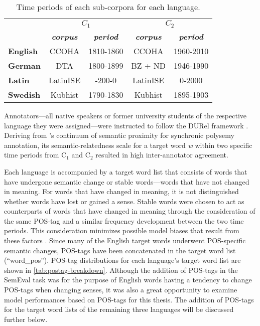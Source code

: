 \begin{table}[h]
\small
\centering
\begin{tabular}{l|cc|cc|}
\cline{2-5}
\textbf{}      & \multicolumn{2}{c|}{\textbf{$C_1$}}                    & \multicolumn{2}{c|}{\textbf{$C_2$}}                    \\
                                       & \textit{\textbf{corpus}} & \textit{\textbf{period}} & \textit{\textbf{corpus}} & \textit{\textbf{period}} \\ \hline
\multicolumn{1}{|l|}{\textbf{English}} & CCOHA                    & 1810-1860                & CCOHA                    & 1960-2010                \\ \hline
\multicolumn{1}{|l|}{\textbf{German}}  & DTA                      & 1800-1899                & BZ + ND                  & 1946-1990                \\ \hline
\multicolumn{1}{|l|}{\textbf{Latin}}   & LatinISE                 & -200-0                   & LatinISE                 & 0-2000                   \\ \hline
\multicolumn{1}{|l|}{\textbf{Swedish}} & Kubhist                  & 1790-1830                & Kubhist                  & 1895-1903                \\ \hline
\end{tabular}
\caption{Time periods of each sub-corpora for each language.}
\label{tab:subcorpora-time}
\end{table}

Annotators—all native speakers or former university students of the respective language they were assigned—were instructed to follow the DURel framework \citep{DURel2018}. Deriving from \citet{blank1997prinzipien}’s continuum of semantic proximity for synchronic polysemy annotation, its semantic-relatedness scale for a target word \emph{w} within two specific time periods from C$_1$ and C$_2$ resulted in high inter-annotator agreement. 
	
Each language is accompanied by a target word list that consists of words that have undergone semantic change or stable words—words that have not changed in meaning. For words that have changed in meaning, it is not distinguished whether words have lost or gained a sense. Stable words were chosen to act as counterparts of words that have changed in meaning through the consideration of the same POS-tag and a similar frequency development between the two time periods. This consideration minimizes possible model biases that result from these factors \citep{dubossarsky-etal-2017-outta}. Since many of the English target words underwent POS-specific semantic changes, POS-tags have been concatenated in the target word list (“word\_pos”). POS-tag distributions for each language's target word list are shown in \autoref{tab:postag-breakdown}. Although the addition of POS-tags in the SemEval task was for the purpose of English words having a tendency to change POS-tags when changing senses, it was also a great opportunity to examine model performances based on POS-tags for this thesis. The addition of POS-tags for the target word lists of the remaining three languages will be discussed further below.
 
